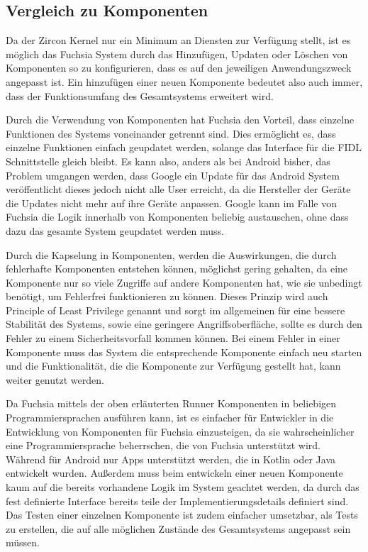\documentclass[a4paper]{scrartcl}
\begin{document}
\subsection{Vergleich zu Komponenten}
Da der Zircon Kernel nur ein Minimum an Diensten zur Verfügung stellt, ist es möglich das Fuchsia System durch das Hinzufügen, Updaten oder Löschen von Komponenten so zu konfigurieren, dass es auf den jeweiligen Anwendungszweck angepasst ist. Ein hinzufügen einer neuen Komponente bedeutet also auch immer, dass der Funktionsumfang des Gesamtsystems erweitert wird.

Durch die Verwendung von Komponenten hat Fuchsia den Vorteil, dass einzelne Funktionen des Systems voneinander getrennt sind. Dies ermöglicht es, dass einzelne Funktionen einfach geupdatet werden, solange das Interface für die FIDL Schnittstelle gleich bleibt. Es kann also, anders als bei Android bisher, das Problem umgangen werden, dass Google ein Update für das Android System veröffentlicht dieses jedoch nicht alle User erreicht, da die Hersteller der Geräte die Updates nicht mehr auf ihre Geräte anpassen. Google kann im Falle von Fuchsia die Logik innerhalb von Komponenten beliebig austauschen, ohne dass dazu das gesamte System geupdatet werden muss.

Durch die Kapselung in Komponenten, werden die Auswirkungen, die durch fehlerhafte Komponenten entstehen können, möglichst gering gehalten, da eine Komponente nur so viele Zugriffe auf andere Komponenten hat, wie sie unbedingt benötigt, um Fehlerfrei funktionieren zu können. Dieses Prinzip wird auch Principle of Least Privilege genannt und sorgt im allgemeinen für eine bessere Stabilität des Systems, sowie eine geringere Angriffsoberfläche, sollte es durch den Fehler zu einem Sicherheitsvorfall kommen können.\cite{Android.Security.PoLP} Bei einem Fehler in einer Komponente muss das System die entsprechende Komponente einfach neu starten und die Funktionalität, die die Komponente zur Verfügung gestellt hat, kann weiter genutzt werden.

Da Fuchsia mittels der oben erläuterten Runner Komponenten in beliebigen Programmiersprachen ausführen kann, ist es einfacher für Entwickler in die Entwicklung von Komponenten für Fuchsia einzusteigen, da sie wahrscheinlicher eine Programmiersprache beherrschen, die von Fuchsia unterstützt wird. Während für Android nur Apps unterstützt werden, die in Kotlin oder Java entwickelt wurden. Außerdem muss beim entwickeln einer neuen Komponente kaum auf die bereits vorhandene Logik im System geachtet werden, da durch das fest definierte Interface bereits teile der Implementierungsdetails definiert sind. Das Testen einer einzelnen Komponente ist zudem einfacher umsetzbar, als Tests zu erstellen, die auf alle möglichen Zustände des Gesamtsystems angepasst sein müssen.
\end{document}
